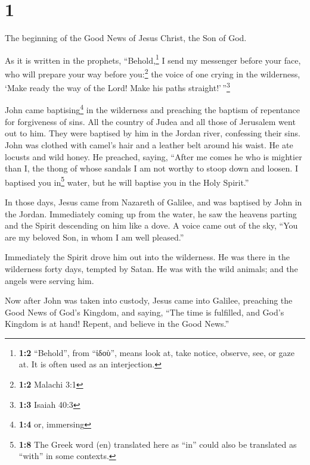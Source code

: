 \hypertarget{section}{%
\section{1}\label{section}}

 The beginning of the Good News of Jesus Christ, the Son
of God.

 As it is written in the prophets, ``Behold,\footnote{\textbf{1:2}
  ``Behold'', from ``ἰδοὺ'', means look at, take notice, observe, see,
  or gaze at. It is often used as an interjection.} I send my messenger
before your face, who will prepare your way before you:\footnote{\textbf{1:2}
  Malachi 3:1}  the voice of one crying in the wilderness,
`Make ready the way of the Lord! Make his paths
straight!'\,''\footnote{\textbf{1:3} Isaiah 40:3}

 John came baptising\footnote{\textbf{1:4} or, immersing}
in the wilderness and preaching the baptism of repentance for
forgiveness of sins.  All the country of Judea and all
those of Jerusalem went out to him. They were baptised by him in the
Jordan river, confessing their sins.  John was clothed
with camel's hair and a leather belt around his waist. He ate locusts
and wild honey.  He preached, saying, ``After me comes he
who is mightier than I, the thong of whose sandals I am not worthy to
stoop down and loosen.  I baptised you in\footnote{\textbf{1:8}
  The Greek word (en) translated here as ``in'' could also be translated
  as ``with'' in some contexts.} water, but he will baptise you in the
Holy Spirit.''

 In those days, Jesus came from Nazareth of Galilee, and
was baptised by John in the Jordan.  Immediately coming
up from the water, he saw the heavens parting and the Spirit descending
on him like a dove.  A voice came out of the sky, ``You
are my beloved Son, in whom I am well pleased.''

 Immediately the Spirit drove him out into the
wilderness.  He was there in the wilderness forty days,
tempted by Satan. He was with the wild animals; and the angels were
serving him.

 Now after John was taken into custody, Jesus came into
Galilee, preaching the Good News of God's Kingdom,  and
saying, ``The time is fulfilled, and God's Kingdom is at hand! Repent,
and believe in the Good News.''

